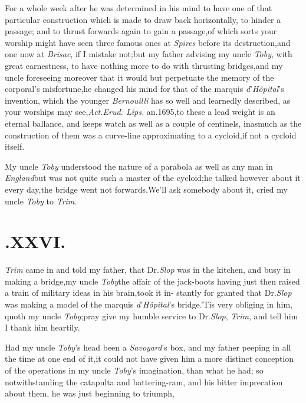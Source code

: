 \documentclass{article}
\begin{document}
For a whole week after he was determined in his mind to have one
of that particular construction which is made to draw back
horizontally, to hinder a passage; and to thrust forwards again to
gain a passage,\tsk of which sorts your worship might have seen
three famous ones at \textit{Spires} before its destruction,\tsk and
one now at \textit{Brisac}, if I mistake not;\tsk but my father
advising my uncle \textit{Toby}, with great earnestness, to have
nothing more to do with thrusting bridges,\tsk and my uncle
foreseeing moreover that it would but perpetuate the memory of the
corporal’s misfortune,\tsk he changed his mind for that of
the marquis \textit{d}’\textit{Hôpital}’s invention,
which the younger \textit{Bernouilli} has so well and learnedly
described, as your worships may see,\tsh \textit{Act.\@ Erud.\@
Lips.\@} an.\@ 1695,\tsk to these a lead weight is an eternal
ballance, and keeps watch as well as a couple of centinels, inasmuch
as the construction of them was a curve-line approximating to a
cycloid,\tsh if not a cycloid itself.

My uncle \textit{Toby} understood the nature of a parabola as well
as any man in \textit{England}\tsk but was not quite such a master
of the cycloid;\tsk he talked however about it every
day,\tsh the bridge went not
forwards.\tsh We’ll ask somebody about it, cried my
uncle \textit{Toby} to \textit{Trim}.

\section{.\quad  XXVI.}

 \textit{Trim} came in and told my
father, that Dr.\@ \textit{Slop} was in the\break
kitchen, and busy in making a bridge,\tsk my uncle
\textit{Toby}\tsh the affair of the jack-boots having just then
raised a train of military ideas in his brain,\tsh took it
in-
stantly for granted that Dr.\@ \textit{Slop} was making a model
of the marquis \textit{d}’\textit{Hôpital}’s bridge.\tsh ’Tis
very obliging in him, quoth my uncle \textit{Toby};\tsk pray
give my humble service to Dr.\@ \textit{Slop}, \textit{Trim},
and tell him I thank him heartily.

Had my uncle \textit{Toby}’s head been a \textit{Sa\-voyard}’s box, and my father
peeping in all the time at one end of it,\tsk it could not have given him a more
distinct conception of the operations in my uncle \textit{Toby}’s imagination, than
what he had; so notwithstanding the catapulta and bat\-tering-ram, and his bitter
imprecation\break
about them, he was just beginning to triumph,\tsh
\end{document}
